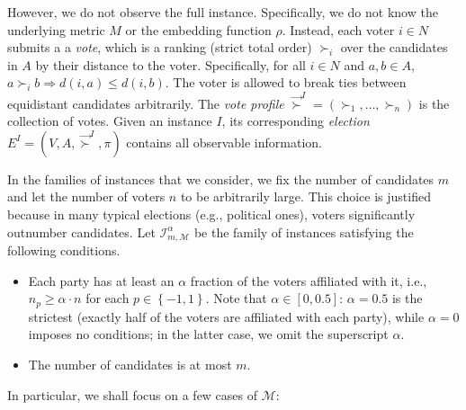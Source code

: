 \documentclass[letterpaper]{article} %
\theoremstyle{definition}
\newcommand{\set}[1]{\left\{#1\right\}}
\renewcommand{\vec}{\overrightarrow}
\newcommand{\calI}{\mathcal{I}}
\newcommand{\calM}{\mathcal{M}}
\newcommand{\vsucc}{\vec{\succ}}
\newcommand{\pleft}{-1}
\newcommand{\pright}{1}
\begin{document}
However, we do not observe the full instance. Specifically, we do not know the underlying metric $M$ or the embedding function $\rho$. Instead, each voter $i \in N$ submits a a \emph{vote}, which is a ranking (strict total order) $\succ_i$ over the candidates in $A$ by their distance to the voter. Specifically, for all $i \in N$ and $a,b \in A$, $a \succ_i b \Rightarrow d(i,a) \le d(i,b)$. The voter is allowed to break ties between equidistant candidates arbitrarily. The \emph{vote profile} $\vsucc^I = (\succ_1,\ldots,\succ_n)$ is the collection of votes. Given an instance $I$, its corresponding \emph{election} $E^I = (V,A,\vsucc^I,\pi)$ contains all observable information.

In the families of instances that we consider, we fix the number of candidates $m$ and let the number of voters $n$ to be arbitrarily large. This choice is justified because in many typical elections (e.g., political ones), voters significantly outnumber candidates. Let $\calI^{\alpha}_{m,\calM}$ be the family of instances satisfying the following conditions.
\begin{itemize}
	\item Each party has at least an $\alpha$ fraction of the voters affiliated with it, i.e., $n_p \ge \alpha \cdot n$ for each $p \in \set{\pleft,\pright}$. Note that $\alpha \in [0,0.5]$: $\alpha = 0.5$ is the strictest (exactly half of the voters are affiliated with each party), while $\alpha=0$ imposes no conditions; in the latter case, we omit the superscript $\alpha$.
	\item The number of candidates is at most $m$.%
	\end{itemize}
	In particular, we shall focus on a few cases of $\calM:$
\end{document}
